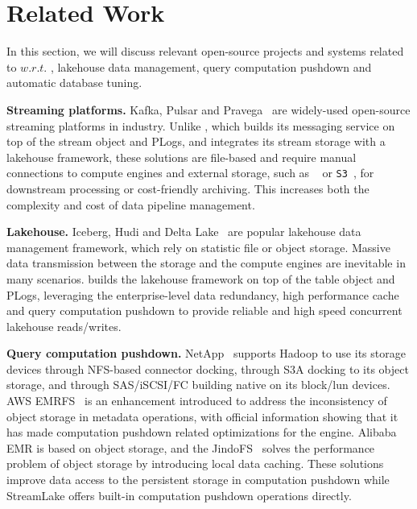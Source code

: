 \section{Related Work} 
\label{sec:related}


In this section, we will discuss relevant open-source projects and systems related to \sys $w.r.t.$ , lakehouse data management, query computation pushdown and automatic database tuning.

\noindent\textbf{Streaming platforms.} Kafka, Pulsar and Pravega~\cite{} are widely-used open-source streaming platforms in industry. Unlike \sys, which builds its messaging service on top of the stream object and PLogs, and integrates its stream storage with a lakehouse framework, these solutions are file-based and require manual connections to compute engines and external storage, such as \hdfs~\cite{} or \texttt{S3}~\cite{}, for downstream processing or cost-friendly archiving. This increases both the complexity and cost of data pipeline management.



\noindent\textbf{Lakehouse.} Iceberg, Hudi and Delta Lake~\cite{} are popular  lakehouse data management framework, which rely on statistic file or object storage. 
Massive data transmission between the storage and the compute engines are inevitable in many scenarios. 
 \sys builds the lakehouse framework on top of the table object and PLogs, leveraging the enterprise-level data redundancy, high performance cache and query computation pushdown to provide reliable and high speed concurrent lakehouse reads/writes. 



\noindent\textbf{Query computation pushdown.} NetApp~\cite{} supports Hadoop to use its storage devices through NFS-based connector docking, through S3A docking to its object storage, and through SAS/iSCSI/FC building native \hdfs on its block/lun devices. AWS EMRFS~\cite{} is an enhancement introduced to address the inconsistency of object storage in metadata operations, with official information showing that it has made computation pushdown related optimizations for the engine. Alibaba EMR is based on object storage, and the JindoFS~\cite{} solves the performance problem of object storage by introducing local data caching. These solutions improve data access to the persistent storage in computation pushdown while StreamLake offers built-in computation pushdown operations directly. 

